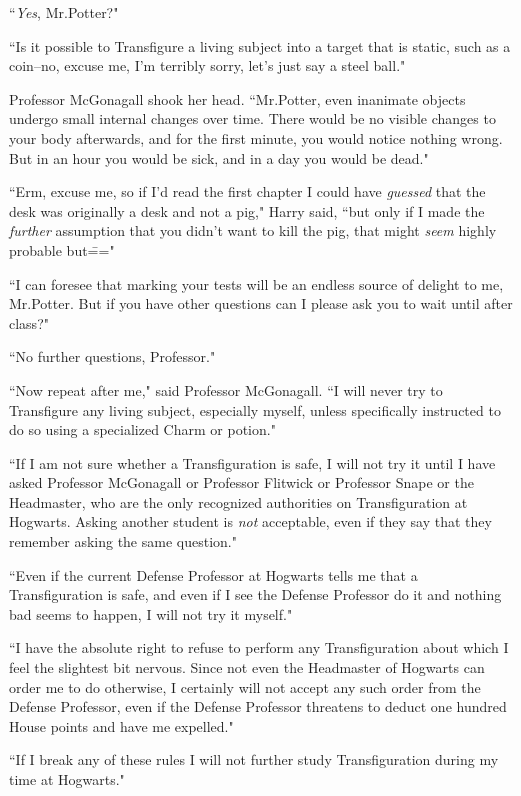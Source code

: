 ``\emph{Yes}, Mr.\?Potter?"

``Is it possible to Transfigure a living subject into a target that is static, such as a coin\---no, excuse me, I'm terribly sorry, let's just say a steel ball."

Professor McGonagall shook her head. ``Mr.\?Potter, even inanimate objects undergo small internal changes over time. There would be no visible changes to your body afterwards, and for the first minute, you would notice nothing wrong. But in an hour you would be sick, and in a day you would be dead."

``Erm, excuse me, so if I'd read the first chapter I could have \emph{guessed} that the desk was originally a desk and not a pig," Harry said, ``but only if I made the \emph{further} assumption that you didn't want to kill the pig, that might \emph{seem} highly probable but\==="

``I can foresee that marking your tests will be an endless source of delight to me, Mr.\?Potter. But if you have other questions can I please ask you to wait until after class?"

``No further questions, Professor."

``Now repeat after me," said Professor McGonagall. ``I will never try to Transfigure any living subject, especially myself, unless specifically instructed to do so using a specialized Charm or potion."

``If I am not sure whether a Transfiguration is safe, I will not try it until I have asked Professor McGonagall or Professor Flitwick or Professor Snape or the Headmaster, who are the only recognized authorities on Transfiguration at Hogwarts. Asking another student is \emph{not} acceptable, even if they say that they remember asking the same question."

``Even if the current Defense Professor at Hogwarts tells me that a Transfiguration is safe, and even if I see the Defense Professor do it and nothing bad seems to happen, I will not try it myself."

``I have the absolute right to refuse to perform any Transfiguration about which I feel the slightest bit nervous. Since not even the Headmaster of Hogwarts can order me to do otherwise, I certainly will not accept any such order from the Defense Professor, even if the Defense Professor threatens to deduct one hundred House points and have me expelled."

``If I break any of these rules I will not further study Transfiguration during my time at Hogwarts."

